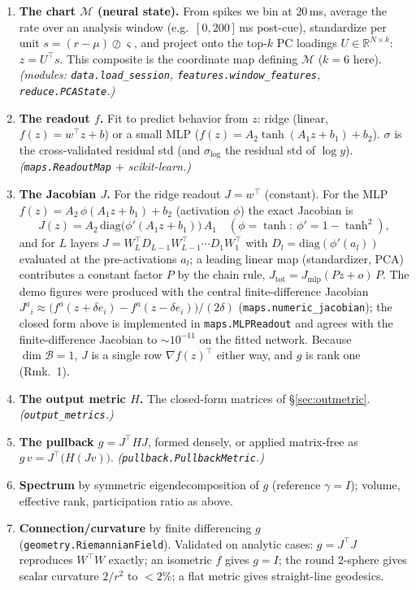 \documentclass[11pt]{article}
\newcommand{\M}{\mathcal{M}}
\newcommand{\B}{\mathcal{B}}
\newcommand{\R}{\mathbb{R}}
\begin{document}
\begin{enumerate}
\item \textbf{The chart $\M$ (neural state).} From spikes we bin at $20$\,ms, average the rate
      over an analysis window (e.g.\ $[0,200]$\,ms post-cue), standardize per unit
      $s=(r-\mu)\oslash\varsigma$, and project onto the top-$k$ PC loadings $U\in\R^{N\times k}$:
      $z=U^{\top}s$. This composite is the coordinate map defining $\M$ ($k=6$ here).
      \emph{(modules: \texttt{data.load\_session}, \texttt{features.window\_features},
      \texttt{reduce.PCAState}.)}
\item \textbf{The readout $f$.} Fit to predict behavior from $z$: ridge (linear,
      $f(z)=w^{\top}z+b$) or a small MLP ($f(z)=A_{2}\tanh(A_{1}z+b_{1})+b_{2}$).
      $\sigma$ is the cross-validated residual std (and $\sigma_{\log}$ the residual std of
      $\log y$). \emph{(\texttt{maps.ReadoutMap} $+$ scikit-learn.)}
\item \textbf{The Jacobian $J$.} For the ridge readout $J=w^{\top}$ (constant). For the MLP
      $f(z)=A_{2}\,\phi(A_{1}z+b_{1})+b_{2}$ (activation $\phi$) the exact Jacobian is
      \[
        J(z)=A_{2}\,\mathrm{diag}\!\big(\phi'(A_{1}z+b_{1})\big)\,A_{1}
        \quad(\phi=\tanh:\ \phi'=1-\tanh^{2}),
      \]
      and for $L$ layers $J=W_{L}^{\top}D_{L-1}W_{L-1}^{\top}\cdots D_{1}W_{1}^{\top}$ with
      $D_{l}=\mathrm{diag}(\phi'(a_{l}))$ evaluated at the pre-activations $a_l$; a leading
      linear map (standardizer, PCA) contributes a constant factor $P$ by the chain rule,
      $J_{\text{tot}}=J_{\mathrm{mlp}}(Pz+o)\,P$. The demo figures were produced with the
      central finite-difference Jacobian
      $J^{a}{}_{i}\approx\big(f^{a}(z+\delta e_{i})-f^{a}(z-\delta e_{i})\big)/(2\delta)$
      (\texttt{maps.numeric\_jacobian}); the closed form above is implemented in
      \texttt{maps.MLPReadout} and agrees with the finite-difference Jacobian to
      $\sim\!10^{-11}$ on the fitted network. Because $\dim\B=1$, $J$ is a single row
      $\nabla f(z)^{\top}$ either way, and $g$ is rank one (Rmk.~1).
\item \textbf{The output metric $H$.} The closed-form matrices of \S\ref{sec:outmetric}.
      \emph{(\texttt{output\_metrics}.)}
\item \textbf{The pullback $g=J^{\top}HJ$}, formed densely, or applied matrix-free as
      $g\,v=J^{\top}\!\big(H(Jv)\big)$. \emph{(\texttt{pullback.PullbackMetric}.)}
\item \textbf{Spectrum} by symmetric eigendecomposition of $g$ (reference $\gamma=I$);
      volume, effective rank, participation ratio as above.
\item \textbf{Connection/curvature} by finite differencing $g$ (\texttt{geometry.RiemannianField}).
      Validated on analytic cases: $g=J^{\top}J$ reproduces $W^{\top}W$ exactly; an isometric
      $f$ gives $g=I$; the round $2$-sphere gives scalar curvature $2/r^{2}$ to $<2\%$; a flat
      metric gives straight-line geodesics.
\end{enumerate}
\end{document}
